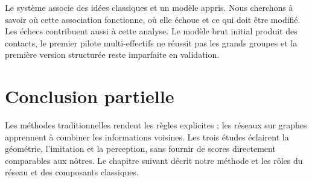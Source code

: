 Le système associe des idées classiques et un modèle appris. Nous cherchons à savoir où cette association fonctionne, où elle échoue et ce qui doit être modifié. Les échecs contribuent aussi à cette analyse. Le modèle brut initial produit des contacts, le premier pilote multi-effectifs ne réussit pas les grands groupes et la première version structurée reste imparfaite en validation.

\section{Conclusion partielle}
Les méthodes traditionnelles rendent les règles explicites ; les réseaux sur graphes apprennent à combiner les informations voisines. Les trois études éclairent la géométrie, l'imitation et la perception, sans fournir de scores directement comparables aux nôtres. Le chapitre suivant décrit notre méthode et les rôles du réseau et des composants classiques.

